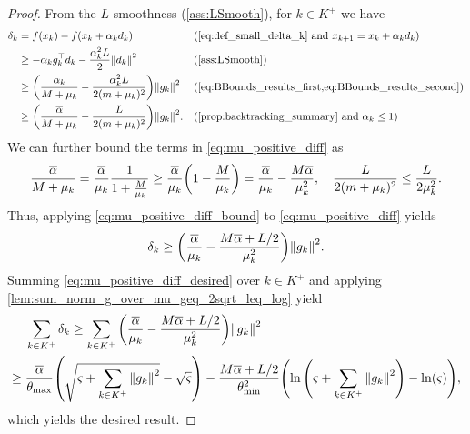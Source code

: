 \documentclass[journal_revised_MPC]{subfiles}
\begin{document}
\begin{proof}
    From the $L$-smoothness (\cref{ass:LSmooth}), for $k \in K^+$ we have
    \begin{align}
        \delta_k & = f(x_k) - f(x_k + \alpha_{k} d_{k})                                                          &  & (\text{\cref{eq:def_small_delta_k} and } x_{{k}+1}=x_{k} + \alpha_{k} d_{k})      \notag \\
                 & \ge -\alpha_{k} g_{k}^\top d_{k} - \frac{\alpha_{k}^2 L}{2} \norm{d_{k}}^2                    &  & (\text{\cref{ass:LSmooth}})      \notag                                                  \\
                 & \ge \qty(\frac{\alpha_{k}}{M+\mu_{k}} - \frac{\alpha_{k}^2 L}{2(m+\mu_{k})^2}) \norm{g_{k}}^2 &  & (\text{\cref{eq:BBounds_results_first,eq:BBounds_results_second}}) \notag                \\
                 & \ge \qty(\frac{\overline{\alpha}}{M+\mu_{k}} - \frac{L}{2(m+\mu_{k})^2}) \norm{g_{k}}^2.      &  & (\text{\cref{prop:backtracking_summary} and $\alpha_k \leq 1$})
        \label{eq:mu_positive_diff}
    \end{align}
    We can further bound the terms in \cref{eq:mu_positive_diff} as
    \begin{equation}\label{eq:mu_positive_diff_bound}
        \frac{\overline{\alpha}}{M+\mu_{k}} = \frac{\overline{\alpha}}{\mu_{k}} \frac{1}{1+\frac{M}{\mu_{k}}} \geq \frac{\overline{\alpha}}{\mu_{k}} \qty(1-\frac{M}{\mu_{k}}) = \frac{\overline{\alpha}}{\mu_{k}} - \frac{M\overline{\alpha}}{\mu_{k}^2}, \quad
        \frac{L}{2(m+\mu_{k})^2} \le \frac{L}{2\mu_{k}^2}.
    \end{equation}
    Thus, applying \cref{eq:mu_positive_diff_bound} to \cref{eq:mu_positive_diff} yields
    \begin{equation}\label{eq:mu_positive_diff_desired}
        \delta_k \ge \qty(\frac{\overline{\alpha}}{\mu_{k}} - \frac{M\overline{\alpha}+L/2}{\mu_{k}^2}) \norm{g_{k}}^2.
    \end{equation}
    Summing \cref{eq:mu_positive_diff_desired} over $k \in K^+$ and applying \cref{lem:sum_norm_g_over_mu_geq_2sqrt_leq_log} yield
    \begin{align*}
              & \sum_{{k} \in K^+} \delta_k \ge \sum_{{k} \in K^+} \qty(\frac{\overline{\alpha}}{\mu_{k}} - \frac{M\overline{\alpha}+L/2}{\mu_{k}^2})\norm{g_{k}}^2                                                                                                 \\
        \ge{} & \frac{\overline{\alpha}}{\theta_{\max}} \qty(\sqrt{\varsigma + \sum_{{k} \in K^+} \norm{g_{k}}^2} - \sqrt{\varsigma}) - \frac{M\overline{\alpha}+L/2}{\theta_{\min}^2} \qty(\ln\qty(\varsigma+\sum_{{k} \in K^+} \norm{g_{k}}^2) - \ln(\varsigma)),
    \end{align*}
    which yields the desired result.
    \myQED
\end{proof}
\end{document}
